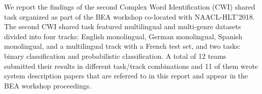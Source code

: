 We report the findings of the second Complex Word Identification (CWI) shared task organized as part of the BEA workshop co-located with NAACL-HLT'2018. The second CWI shared task featured multilingual and multi-genre datasets divided into four tracks: English monolingual, German monolingual, Spanish monolingual, and a multilingual track with a French test set, and two tasks: binary classification and probabilistic classification. A total of 12 teams submitted their results in different task/track combinations and 11 of them wrote system description papers that are referred to in this report and appear in the BEA workshop proceedings.
